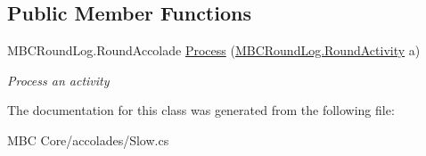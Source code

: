 \subsection*{Public Member Functions}
\begin{DoxyCompactItemize}
\item 
\hypertarget{class_m_b_c_core_1_1mbc_1_1accolades_1_1_slow_a667af8859ec060afcf309aa893c6ae61}{M\-B\-C\-Round\-Log.\-Round\-Accolade \hyperlink{class_m_b_c_core_1_1mbc_1_1accolades_1_1_slow_a667af8859ec060afcf309aa893c6ae61}{Process} (\hyperlink{class_m_b_c_core_1_1_m_b_c_round_log_1_1_round_activity}{M\-B\-C\-Round\-Log.\-Round\-Activity} a)}\label{class_m_b_c_core_1_1mbc_1_1accolades_1_1_slow_a667af8859ec060afcf309aa893c6ae61}

\begin{DoxyCompactList}\small\item\em Process an activity\end{DoxyCompactList}\end{DoxyCompactItemize}


The documentation for this class was generated from the following file\-:\begin{DoxyCompactItemize}
\item 
M\-B\-C Core/accolades/Slow.\-cs\end{DoxyCompactItemize}
